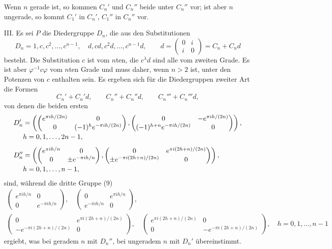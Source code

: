 \documentclass[11pt]{article}
\begin{document}
Wenn $n$ gerade ist, so kommen $C_n'$ und $C_n''$ beide unter $C_n''$ vor; ist aber $n$ ungerade, so kommt $C_1'$ in $C_n'$, $C_1''$ in $C_n''$ vor.

III. Es sei $P$ die Diedergruppe $D_n$, die aus den Substitutionen
\begin{equation}
 D_n=1,c,c^2,\ldots,c^{n-1},\quad
 d,cd,c^2d,\ldots,c^{n-1}d,\qquad
 d=\begin{pmatrix}0&i\\ i&0\end{pmatrix}=C_n+C_nd
 \tag{8}
\end{equation}
besteht. Die Substitution $c$ ist vom $n$ten, die $c^\lambda d$ sind alle vom zweiten Grade. Es ist aber $\varphi^{-1}c\varphi$ vom $n$ten Grade und muss daher, wenn $n>2$ ist, unter den Potenzen von $c$ enthalten sein. Es ergeben sich für die Diedergruppen zweiter Art die Formen
\begin{equation}
 C_n'+C_n'd,\qquad C_n''+C_n''d,\qquad C_n'''+C_n'''d, \tag{9}
\end{equation}
von denen die beiden ersten
\[
\begin{aligned}
D_n'&=\left(
\begin{pmatrix}e^{\pi i h/(2n)}&0\\0&(-1)^h e^{-\pi i h/(2n)}\end{pmatrix},
\begin{pmatrix}0&-e^{\pi i h/(2n)}\\ (-1)^{h+n}e^{-\pi i h/(2n)}&0\end{pmatrix}
\right),\\[-0.2em]
&\hfill h=0,1,\ldots,2n-1,\\[0.4em]
D_n''&=\left(
\begin{pmatrix}e^{\pi i h/n}&0\\0&\pm e^{-\pi i h/n}\end{pmatrix},
\begin{pmatrix}0&e^{\pi i(2h+n)/(2n)}\\
 \pm e^{-\pi i(2h+n)/(2n)}&0\end{pmatrix}
\right),\\[-0.2em]
&\hfill h=0,1,\ldots,n-1,
\end{aligned}
\]
sind, während die dritte Gruppe (9)
\[
\begin{gathered}
 \begin{pmatrix}e^{\pi i h/n}&0\\0&e^{-\pi i h/n}\end{pmatrix},\quad
 \begin{pmatrix}0&e^{\pi i h/n}\\e^{-\pi i h/n}&0\end{pmatrix},\\
 \begin{pmatrix}0&e^{\pi i(2h+n)/(2n)}\\-e^{-\pi i(2h+n)/(2n)}&0\end{pmatrix},\quad
 \begin{pmatrix}e^{\pi i(2h+n)/(2n)}&0\\0&-e^{-\pi i(2h+n)/(2n)}\end{pmatrix},
 \quad h=0,1,\ldots,n-1
\end{gathered}
\]
ergiebt, was bei geradem $n$ mit $D_n''$, bei ungeradem $n$ mit $D_n'$ übereinstimmt.
\end{document}
